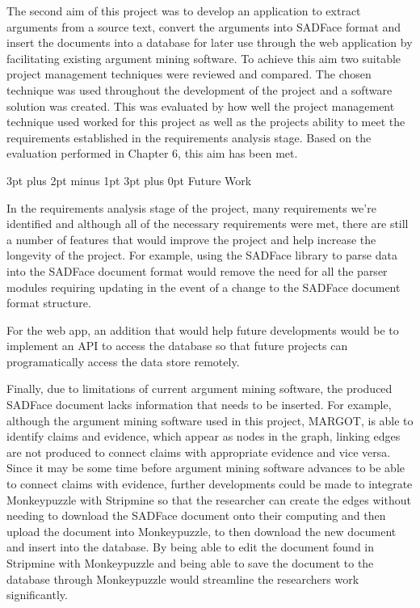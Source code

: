 \documentclass[12pt,a4paper]{article}
\makeatletter
\renewcommand\subsection{\@startsection {subsection}{1}{2mm} %
                               {3pt plus 2pt minus 1pt} %
                               {3pt plus 0pt} %
                               {\normalfont\bfseries}}
\makeatother
\begin{document}
The second aim of this project was to develop an application to extract arguments from a source text, convert the arguments into SADFace format and insert the documents into a database for later use through the web application by facilitating existing argument mining software. To achieve this aim two suitable project management techniques were reviewed and compared. The chosen technique was used throughout the development of the project and a software solution was created. This was evaluated by how well the project management technique used worked for this project as well as the projects ability to meet the requirements established in the requirements analysis stage. Based on the evaluation performed in Chapter 6, this aim has been met.

\subsection{Future Work}

In the requirements analysis stage of the project, many requirements we're identified and although all of the necessary requirements were met, there are still a number of features that would improve the project and help increase the longevity of the project. For example, using the SADFace library to parse data into the SADFace document format would remove the need for all the parser modules requiring updating in the event of a change to the SADFace document format structure.

For the web app, an addition that would help future developments would be to implement an API to access the database so that future projects can programatically access the data store remotely.

Finally, due to limitations of current argument mining software, the produced SADFace document lacks information that needs to be inserted. For example, although the argument mining software used in this project, MARGOT, is able to identify claims and evidence, which appear as nodes in the graph, linking edges are not produced to connect claims with appropriate evidence and vice versa. Since it may be some time before argument mining software advances to be able to connect claims with evidence, further developments could be made to integrate Monkeypuzzle with Stripmine so that the researcher can create the edges without needing to download the SADFace document onto their computing and then upload the document into Monkeypuzzle, to then download the new document and insert into the database. By being able to edit the document found in Stripmine with Monkeypuzzle and being able to save the document to the database through Monkeypuzzle would streamline the researchers work significantly.
\end{document}
